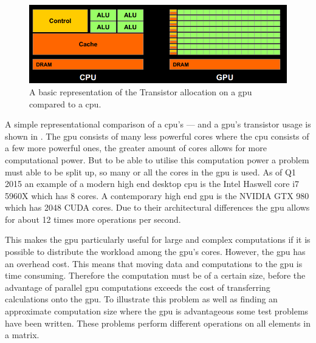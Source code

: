 \begin{figure}[h!]
\centering
 \includegraphics[width=1\textwidth]{figures/GPUCPUimage.png} %
\caption{A basic representation of the Transistor allocation on a \acrshort{gpu} compared to a \acrshort{cpu}.\citep{NvidiaCUDASeminar}}\label{image:gpucpuimage}
\vspace{-15pt}
\end{figure}

A simple representational comparison of a \acrshort{cpu}'s --- and a \acrshort{gpu}'s transistor usage is shown in .
The \acrshort{gpu} consists of many less powerful cores where the \acrshort{cpu} consists of a few more powerful ones, the greater amount of cores allows for more computational power.
But to be able to utilise this computation power a problem must able to be split up, so many or all the cores in the \acrshort{gpu} is used.
As of Q1 2015 an example of a modern high end desktop \acrshort{cpu} is the Intel Haswell core i7 5960X which has 8 cores.\citep{puget}
A contemporary high end \acrshort{gpu} is the NVIDIA GTX 980 which has 2048 CUDA cores.\citep{techpowerup,gtx980}
Due to their architectural differences the \acrshort{gpu} allows for about 12 times more operations per second.

This makes the \acrshort{gpu} particularly useful for large and complex computations if it is possible to distribute the workload among the \acrshort{gpu}'s cores.
However, the \acrshort{gpu} has an overhead cost.
This means that moving data and computations to the \acrshort{gpu} is time consuming.
Therefore the computation must be of a certain size, before the advantage of parallel \acrshort{gpu} computations exceeds the cost of transferring calculations onto the \acrshort{gpu}.
To illustrate this problem as well as finding an approximate computation size where the \acrshort{gpu} is advantageous some test problems have been written. 
These problems perform different operations on all elements in a matrix. 

